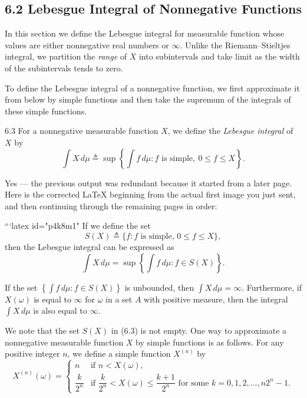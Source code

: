 \subsection*{6.2 Lebesgue Integral of Nonnegative Functions}

In this section we define the Lebesgue integral for measurable function whose values are either nonnegative real numbers or $\infty$. Unlike the Riemann--Stieltjes integral, we partition the \textit{range} of $X$ into subintervals and take limit as the width of the subintervals tends to zero.

To define the Lebesgue integral of a nonnegative function, we first approximate it from below by simple functions and then take the supremum of the integrals of these simple functions.

\begin{defbox}{6.3}
For a nonnegative measurable function $X$, we define the \textit{Lebesgue integral} of $X$ by
\[
\int X\, d\mu \triangleq \sup \left\{ \int f\, d\mu : f \text{ is simple},\ 0\le f\le X \right\}.
\]
\end{defbox}
Yes — the previous output was redundant because it started from a later page. Here is the corrected LaTeX beginning from the actual first image you just sent, and then continuing through the remaining pages in order:

```latex id="p4k8m1"
If we define the set
\begin{equation}
S(X) \triangleq \{f : f \text{ is simple, } 0 \le f \le X\},
\tag{6.3}
\end{equation}
then the Lebesgue integral can be expressed as
\[
\int X\, d\mu = \sup \left\{ \int f\, d\mu : f \in S(X) \right\}.
\]

If the set $\left\{\int f\, d\mu : f \in S(X)\right\}$ is unbounded, then $\int X\, d\mu = \infty$. Furthermore, if $X(\omega)$ is equal to $\infty$ for $\omega$ in a set $A$ with positive measure, then the integral $\int X\, d\mu$ is also equal to $\infty$.

We note that the set $S(X)$ in (6.3) is not empty. One way to approximate a nonnegative measurable function $X$ by simple functions is as follows. For any positive integer $n$, we define a simple function $X^{(n)}$ by
\begin{equation}
X^{(n)}(\omega)=
\begin{cases}
n & \text{if } n < X(\omega), \\[0.5em]
\dfrac{k}{2^n} & \text{if } \dfrac{k}{2^n} < X(\omega) \le \dfrac{k+1}{2^n} \text{ for some } k=0,1,2,\dots,n2^n-1.
\end{cases}
\tag{6.4}
\end{equation}


